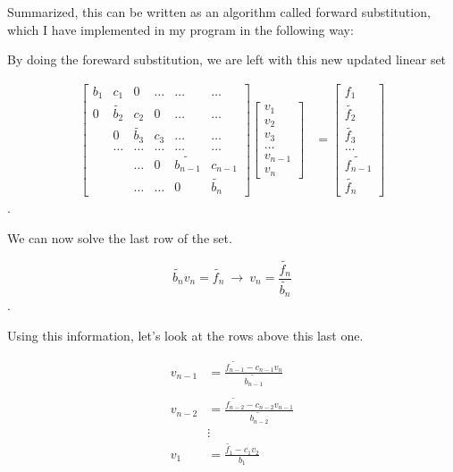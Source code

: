 \documentclass[a4paper,norsk,12pt,oneside]{article}
\begin{document}
Summarized, this can be written as an algorithm called forward substitution,
which I have implemented in my program in the following way:



By doing the foreward substitution, we are left with this new updated linear set

\begin{align}\label{eq:general}
	\label{full eq Ax=f}	
	\begin{bmatrix}
        b_{1} & c_{1} & 0 & \hdots & \hdots & \hdots \\
        0 & \tilde{b_{2}} & c_{2} & 0 & \hdots & \hdots \\
        & 0 & \tilde{b_{3}} & c_{3} & \hdots & \hdots \\
		& \hdots & \hdots & \hdots & \hdots & \hdots \\ 
        && \hdots & 0 & \tilde{b_{n-1}} & c_{n-1} \\
        && \hdots & \hdots & 0 & \tilde{b_{n}} 
	\end{bmatrix} \begin{bmatrix}
	v_1 \\ v_2 \\ v_3 \\ \hdots \\ v_{n-1} \\ v_n
	\end{bmatrix} &= \begin{bmatrix}
        {f_1} \\ \tilde{f_2} \\ \tilde{f_3} \\ \hdots \\ \tilde{f_{n-1}} \\ \tilde{f_n}
	\end{bmatrix}
\end{align}.   

We can now solve the last row of the set.

\begin{equation*}
    \tilde{b_n} v_n = \tilde{f_n} \ \rightarrow \ v_n = \frac{\tilde{f_n}}{\tilde{b_n}} 
\end{equation*}. 

Using this information, let's look at the rows above this last one. 

\begin{align*}
    v_{n-1} &= \frac{\tilde{f_{n-1}} - c_{n-1}v_n}{\tilde{b_{n-1}}}\\\\
    v_{n-2} &= \frac{\tilde{f_{n-2}} - c_{n-2}v_{n-1}}{\tilde{b_{n-2}}}\\
    &\vdots \\
    v_1 &= \frac{\tilde{f_1} - c_1v_2}{b_1}
\end{align*}
\end{document}
